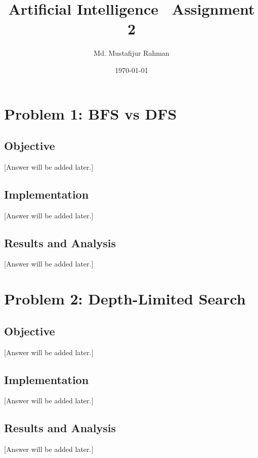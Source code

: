 \documentclass[12pt]{article}
\title{Artificial Intelligence \ Assignment 2}
\author{Md. Mustafijur Rahman}
\date{\today}
\begin{document}
\maketitle

\tableofcontents
\newpage

\section{Problem 1: BFS vs DFS}

\subsection{Objective}

[Answer will be added later.]

\subsection{Implementation}

[Answer will be added later.]

\subsection{Results and Analysis}

[Answer will be added later.]

\section{Problem 2: Depth-Limited Search}

\subsection{Objective}

[Answer will be added later.]

\subsection{Implementation}

[Answer will be added later.]

\subsection{Results and Analysis}

[Answer will be added later.]
\end{document}
